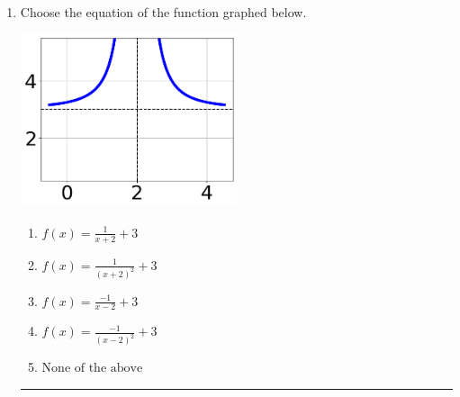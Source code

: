 \documentclass[14pt]{extbook}
\newcommand{\litem}[1]{\item#1\hspace*{-1cm}\rule{\textwidth}{0.4pt}}
\begin{document}
\begin{enumerate}
{\begin{enumerate}[label=\Alph*.]
\end{enumerate} }
\litem{
Choose the equation of the function graphed below.
\begin{center}
    \includegraphics[width=0.5\textwidth]{../Figures/rationalGraphToEquationB.png}
\end{center}
\begin{enumerate}[label=\Alph*.]
\item \( f(x) = \frac{1}{x + 2} + 3 \)
\item \( f(x) = \frac{1}{(x + 2)^2} + 3 \)
\item \( f(x) = \frac{-1}{x - 2} + 3 \)
\item \( f(x) = \frac{-1}{(x - 2)^2} + 3 \)
\item \( \text{None of the above} \)


\end{enumerate}}
\end{enumerate}
\end{document}
